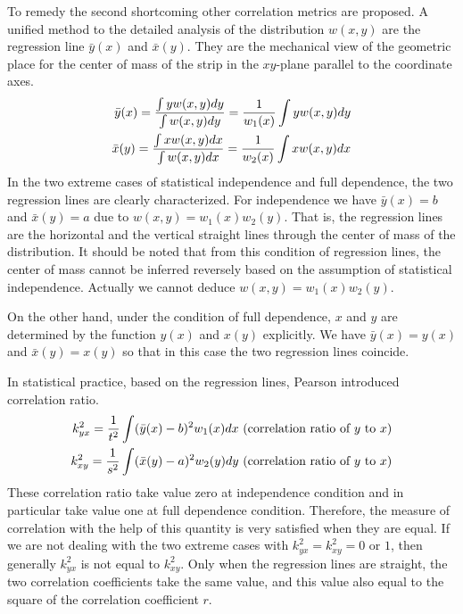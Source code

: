\documentclass{article}
\begin{document}
To remedy the second shortcoming other correlation metrics are proposed.
A unified method to the detailed analysis of the distribution $w(x,y)$ are the regression line $\bar{y}(x)$ and $\bar{x}(y)$.
They are the mechanical view of the geometric place for the center of mass of the strip in
the $xy$-plane parallel to the coordinate axes.
\begin{align}
   \bar{y}(x) = \frac{\int y w(x,y) dy}{\int w(x,y) dy} = \frac{1}{w_1(x)} \int y w(x, y)dy \notag \\
   \bar{x}(y) =  \frac{\int x w(x,y) dx}{\int w(x,y) dx} = \frac{1}{w_2(x)} \int x w(x, y)dx  \label{eq:barxy}
\end{align}
In the two extreme cases of statistical independence and
full dependence, the two regression lines are clearly
characterized. For independence we have $\bar{y}(x) = b$
and $\bar{x}(y)=a$ due to $w(x,y) = w_1(x)w_2(y)$.
That is, the regression lines are the horizontal and
the vertical straight lines through the center of mass of the
distribution. It should be noted that from this condition of regression lines,
the center of mass cannot be inferred reversely based on the assumption of statistical independence.
Actually we cannot deduce $w(x,y)=w_1(x)w_2(y)$.

On the other hand, under
the condition of full dependence, $x$ and
$y$ are determined by the function $y(x)$
and $x(y)$ explicitly. We have $\bar{y}(x) = y(x)$
and $\bar{x}(y) = x(y)$ so that in this case
the two regression lines coincide.

In statistical practice, based on the regression lines,
Pearson introduced \textsf{correlation ratio}.
\begin{align}
   k^2_{yx} = \frac{1}{t^2}\int (\bar{y}(x) - b)^2 w_1(x)dx \textrm{ (correlation ratio of $y$ to $x$}) \notag \\
   k^2_{xy} = \frac{1}{s^2}\int (\bar{x}(y) - a)^2 w_2(y)dy \textrm{ (correlation ratio of $y$ to $x$}) \label{eq:pr}
\end{align}
These correlation ratio take value zero at independence
condition and in particular take value one at full
dependence condition. Therefore, the measure of correlation with the help of this quantity is very satisfied when they are equal. If we are not dealing with the two extreme
cases with $k^2_{yx} = k^2_{xy}=0$ or $1$, then
generally $k^2_{yx}$ is not equal to $k^2_{xy}$. Only when the regression lines are straight, the two correlation coefficients take the same value, and this
value also equal to the square of the correlation
coefficient $r$.
\end{document}
